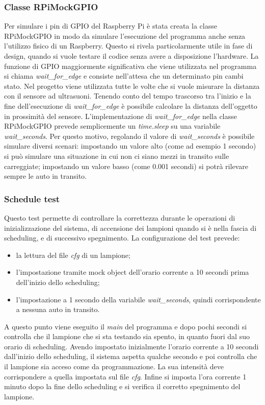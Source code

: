 \subsubsection{Classe RPiMockGPIO}
Per simulare i pin di GPIO del Raspberry Pi è stata creata la classe RPiMockGPIO in modo da simulare l'esecuzione del programma anche senza l'utilizzo fisico di un Raspberry.
Questo si rivela particolarmente utile in fase di design, quando si vuole testare il codice senza avere a disposizione l'hardware.
La funzione di GPIO maggiormente significativa che viene utilizzata nel programma si chiama \textit{wait\_for\_edge} e consiste nell'attesa che un determinato pin cambi stato.
Nel progetto viene utilizzata tutte le volte che si vuole misurare la distanza con il sensore ad ultrasuoni.
Tenendo conto del tempo trascorso tra l'inizio e la fine dell'esecuzione di \textit{wait\_for\_edge} è possibile calcolare la distanza dell'oggetto in prossimità del sensore.
L'implementazione di \textit{wait\_for\_edge} nella classe RPiMockGPIO prevede semplicemente un \textit{time.sleep} su una variabile \textit{wait\_seconds}.
Per questo motivo, regolando il valore di \textit{wait\_seconds} è possibile simulare diversi scenari: impostando un valore alto (come ad esempio 1 secondo) si può simulare una situazione in cui non ci siano mezzi in transito sulle carreggiate;
impostando un valore basso (come 0.001 secondi) si potrà rilevare sempre le auto in transito.

\subsubsection{Schedule test \label{st}}
Questo test permette di controllare la correttezza durante le operazioni di inizializzazione del sistema, di accensione dei lampioni quando si è nella fascia di scheduling, e di successivo spegnimento.
La configurazione del test prevede:
\begin{itemize}
	\item la lettura del file \textit{cfg} di un lampione;
	\item l'impostazione tramite mock object dell'orario corrente a 10 secondi prima dell'inizio dello scheduling;
	\item l'impostazione a 1 secondo della variabile \textit{wait\_seconds}, quindi corrispondente a nessuna auto in transito.
\end{itemize}
A questo punto viene eseguito il \textit{main} del programma e dopo pochi secondi si controlla che il lampione che si sta testando sia spento, in quanto fuori dal suo orario di scheduling.
Avendo impostato inizialmente l'orario corrente a 10 secondi dall'inizio dello scheduling, il sistema aspetta qualche secondo e poi controlla che il lampione sia acceso come da programmazione.
La sua intensità deve corrispondere a quella impostata sul file \textit{cfg}.
Infine si imposta l'ora corrente 1 minuto dopo la fine dello scheduling e si verifica il corretto spegnimento del lampione.

